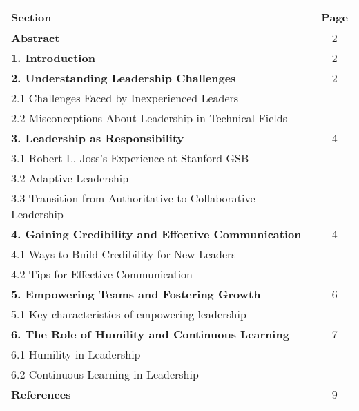 \documentclass[runningheads]{llncs}
\begin{document}
{\renewcommand{\arraystretch}{1.5} %
\begin{table}[h]
\centering
\begin{tabularx}{\textwidth}{|@{\hspace{2mm}}X|@{\hspace{2mm}}c@{\hspace{2mm}}|}
\hline
\textbf{Section} & \textbf{Page} \\ \hline
\textbf{Abstract} & 2 \\ \hline
\textbf{1. Introduction} & 2 \\ \hline
\textbf{2. Understanding Leadership Challenges} & 2 \\
\hspace{5mm}2.1 Challenges Faced by Inexperienced Leaders & \\
\hspace{5mm}2.2 Misconceptions About Leadership in Technical Fields & \\ \hline
\textbf{3. Leadership as Responsibility} & 4 \\
\hspace{5mm}3.1 Robert L. Joss's Experience at Stanford GSB & \\
\hspace{5mm}3.2 Adaptive Leadership & \\
\hspace{5mm}3.3 Transition from Authoritative to Collaborative Leadership & \\ \hline
\textbf{4. Gaining Credibility and Effective Communication }& 4 \\
\hspace{5mm}4.1 Ways to Build Credibility for New Leaders & \\
\hspace{5mm}4.2 Tips for Effective Communication & \\ \hline
\textbf{5. Empowering Teams and Fostering Growth} & 6 \\
\hspace{5mm}5.1 Key characteristics of empowering leadership & \\ \hline
\textbf{6. The Role of Humility and Continuous Learning }& 7 \\
\hspace{5mm}6.1 Humility in Leadership & \\
\hspace{5mm}6.2 Continuous Learning in Leadership & \\ \hline
\textbf{References} & 9 \\ \hline
\end{tabularx}
\end{table}
} %
\end{document}
